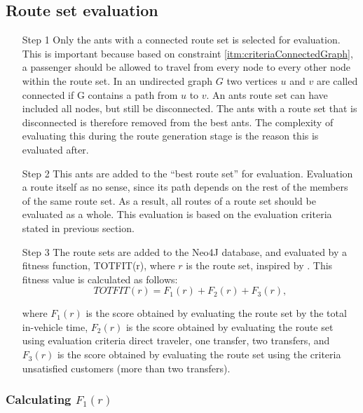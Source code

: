 \subsection{Route set evaluation}
\begin{itemize}
\item[Step 1] Only the ants with a connected route set is selected for evaluation. This is important because based on constraint \ref{itm:criteriaConnectedGraph}, a passenger should be allowed to travel from every node to every other node within the route set. In an undirected graph $G$ two vertices $u$ and $v$ are called connected if G contains a path from $u$ to $v$. An ants route set can have included all nodes, but still be disconnected. The ants with a route set that is disconnected is therefore removed from the best ants. The complexity of evaluating this during the route generation stage is the reason this is evaluated after. 

\item[Step 2] This ants are added to the ``best route set'' for evaluation. Evaluation a route itself as no sense, since its path depends on the rest of the members of the same route set. As a result, all routes of a route set should be evaluated as a whole. This evaluation is based on the evaluation criteria stated in previous section.

\item [Step 3] The route sets are added to the Neo4J database, and evaluated by a fitness function, TOTFIT(r), where $r$ is the route set, inspired by \citep{kechagiopoulos14}.
This fitness value is calculated as follows:
$$ TOTFIT(r) = F_{1}(r) + F_{2}(r) + F_{3}(r), $$

where $ F_{1}(r)$ is the score obtained by evaluating the route set by the total in-vehicle time, $ F_{2}(r)$ is the score obtained by evaluating the route set using evaluation criteria direct traveler, one transfer, two transfers, and $ F_{3}(r)$ is the score obtained by evaluating the route set using the criteria unsatisfied customers (more than two transfers). 
\end{itemize}

\subsubsection{Calculating $F_{1}(r)$}

